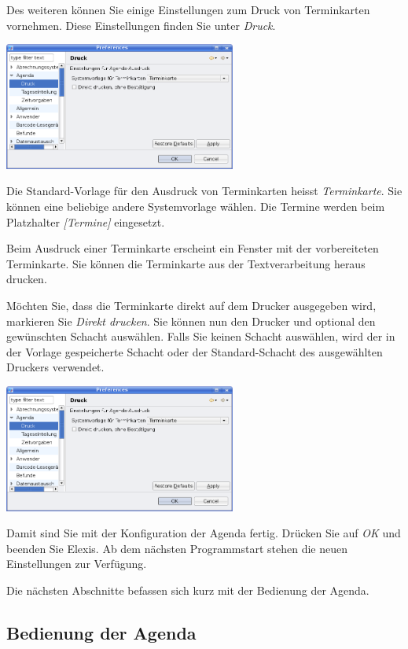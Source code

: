 Des weiteren können Sie einige Einstellungen zum Druck von Terminkarten vornehmen.
Diese Einstellungen finden Sie unter \textit{Druck}.

\includegraphics[width=3in]{images/settings-agenda-druck1.png}

Die Standard-Vorlage für den Ausdruck von Terminkarten heisst \textit{Terminkarte}. Sie können
eine beliebige andere Systemvorlage wählen. Die Termine werden beim Platzhalter
\textit{[Termine]} eingesetzt.

Beim Ausdruck einer Terminkarte erscheint ein Fenster mit der vorbereiteten Terminkarte.
Sie können die Terminkarte aus der Textverarbeitung heraus drucken.

Möchten Sie, dass die Terminkarte direkt auf dem Drucker ausgegeben wird, markieren Sie
\textit{Direkt drucken}. Sie können nun den Drucker und optional den gewünschten Schacht
auswählen. Falls Sie keinen Schacht auswählen, wird der in der Vorlage gespeicherte
Schacht oder der Standard-Schacht des ausgewählten Druckers verwendet.

\includegraphics[width=3in]{images/settings-agenda-druck1.png}

Damit sind Sie mit der Konfiguration der Agenda fertig. Drücken Sie auf \textit{OK} und beenden Sie Elexis. Ab dem nächsten Programmstart stehen die neuen Einstellungen zur Verfügung.

Die nächsten Abschnitte befassen sich kurz mit der Bedienung der Agenda.
\subsection{Bedienung der Agenda}

